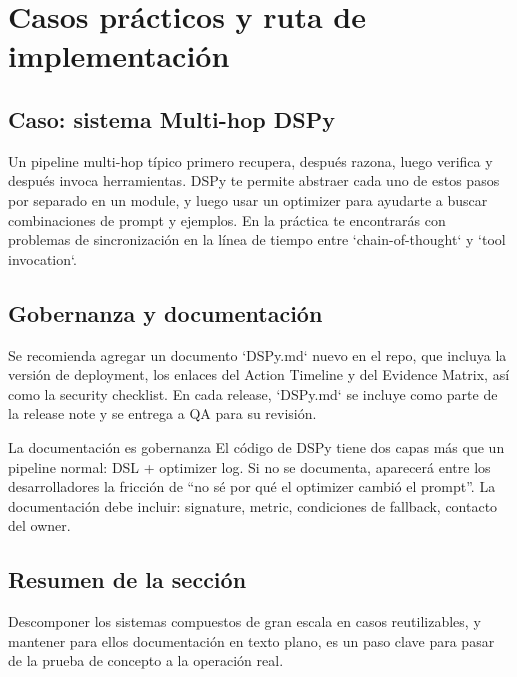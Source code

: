 \section{Casos prácticos y ruta de implementación}

\subsection{Caso: sistema Multi-hop DSPy}

Un pipeline multi-hop típico primero recupera, después razona, luego verifica y después invoca herramientas. DSPy te permite abstraer cada uno de estos pasos por separado en un module, y luego usar un optimizer para ayudarte a buscar combinaciones de prompt y ejemplos. En la práctica te encontrarás con problemas de sincronización en la línea de tiempo entre `chain-of-thought` y `tool invocation`.

\subsection{Gobernanza y documentación}

Se recomienda agregar un documento `DSPy.md` nuevo en el repo, que incluya la versión de deployment, los enlaces del Action Timeline y del Evidence Matrix, así como la security checklist. En cada release, `DSPy.md` se incluye como parte de la release note y se entrega a QA para su revisión.

\begin{importantbox}{La documentación es gobernanza}
El código de DSPy tiene dos capas más que un pipeline normal: DSL + optimizer log. Si no se documenta, aparecerá entre los desarrolladores la fricción de ``no sé por qué el optimizer cambió el prompt''. La documentación debe incluir: signature, metric, condiciones de fallback, contacto del owner.
\end{importantbox}

\subsection{Resumen de la sección}

Descomponer los sistemas compuestos de gran escala en casos reutilizables, y mantener para ellos documentación en texto plano, es un paso clave para pasar de la prueba de concepto a la operación real.

